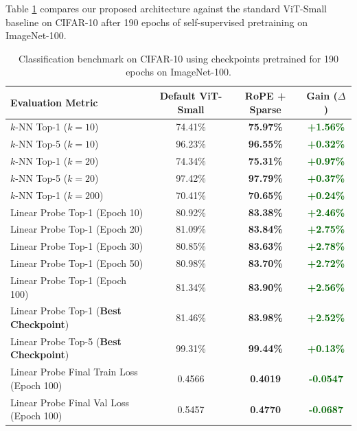 \documentclass[11pt,a4paper]{article}
\begin{document}
Table \ref{tab:quantitative_results} compares our proposed architecture against the standard ViT-Small baseline on CIFAR-10 after 190 epochs of self-supervised pretraining on ImageNet-100.

\begin{table}[ht]
\centering
\small
\caption{Classification benchmark on CIFAR-10 using checkpoints pretrained for 190 epochs on ImageNet-100.}
\label{tab:quantitative_results}
\begin{tabular}{lccc}
\toprule
\textbf{Evaluation Metric} & \textbf{Default ViT-Small} & \textbf{RoPE + Sparse} & \textbf{Gain ($\Delta$)} \\
\midrule
$k$-NN Top-1 ($k=10$) & 74.41\% & \textbf{75.97\%} & \textcolor{darkgreen}{\textbf{+1.56\%}} \\
$k$-NN Top-5 ($k=10$) & 96.23\% & \textbf{96.55\%} & \textcolor{darkgreen}{\textbf{+0.32\%}} \\
$k$-NN Top-1 ($k=20$) & 74.34\% & \textbf{75.31\%} & \textcolor{darkgreen}{\textbf{+0.97\%}} \\
$k$-NN Top-5 ($k=20$) & 97.42\% & \textbf{97.79\%} & \textcolor{darkgreen}{\textbf{+0.37\%}} \\
$k$-NN Top-1 ($k=200$) & 70.41\% & \textbf{70.65\%} & \textcolor{darkgreen}{\textbf{+0.24\%}} \\
\midrule
Linear Probe Top-1 (Epoch 10) & 80.92\% & \textbf{83.38\%} & \textcolor{darkgreen}{\textbf{+2.46\%}} \\
Linear Probe Top-1 (Epoch 20) & 81.09\% & \textbf{83.84\%} & \textcolor{darkgreen}{\textbf{+2.75\%}} \\
Linear Probe Top-1 (Epoch 30) & 80.85\% & \textbf{83.63\%} & \textcolor{darkgreen}{\textbf{+2.78\%}} \\
Linear Probe Top-1 (Epoch 50) & 80.98\% & \textbf{83.70\%} & \textcolor{darkgreen}{\textbf{+2.72\%}} \\
Linear Probe Top-1 (Epoch 100) & 81.34\% & \textbf{83.90\%} & \textcolor{darkgreen}{\textbf{+2.56\%}} \\
Linear Probe Top-1 (\textbf{Best Checkpoint}) & 81.46\% & \textbf{83.98\%} & \textcolor{darkgreen}{\textbf{+2.52\%}} \\
Linear Probe Top-5 (\textbf{Best Checkpoint}) & 99.31\% & \textbf{99.44\%} & \textcolor{darkgreen}{\textbf{+0.13\%}} \\
\midrule
Linear Probe Final Train Loss (Epoch 100) & 0.4566 & \textbf{0.4019} & \textcolor{darkgreen}{\textbf{-0.0547}} \\
Linear Probe Final Val Loss (Epoch 100) & 0.5457 & \textbf{0.4770} & \textcolor{darkgreen}{\textbf{-0.0687}} \\
\bottomrule
\end{tabular}
\end{table}
\end{document}
